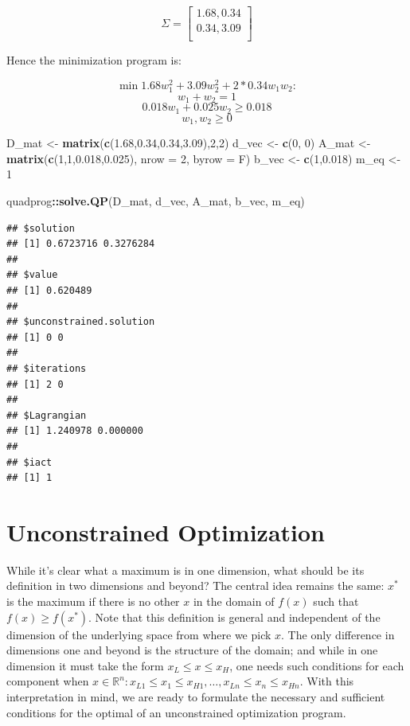 \documentclass[11pt,]{article}
\newenvironment{Shaded}{\begin{snugshade}}{\end{snugshade}}
\newcommand{\KeywordTok}[1]{\textcolor[rgb]{0.13,0.29,0.53}{\textbf{#1}}}
\newcommand{\DataTypeTok}[1]{\textcolor[rgb]{0.13,0.29,0.53}{#1}}
\newcommand{\DecValTok}[1]{\textcolor[rgb]{0.00,0.00,0.81}{#1}}
\newcommand{\FloatTok}[1]{\textcolor[rgb]{0.00,0.00,0.81}{#1}}
\newcommand{\StringTok}[1]{\textcolor[rgb]{0.31,0.60,0.02}{#1}}
\newcommand{\OperatorTok}[1]{\textcolor[rgb]{0.81,0.36,0.00}{\textbf{#1}}}
\newcommand{\NormalTok}[1]{#1}
\begin{document}
\[\Sigma = 
\begin{bmatrix}
1.68, 0.34\\
0.34, 3.09\\
\end{bmatrix}
\]

Hence the minimization program is:

\[\min{} 1.68w_1^2+3.09w_2^2+2*0.34w_1w_2:\] \[w_1+w_2=1\]
\[0.018w_1 + 0.025w_2 \geq 0.018\] \[w_1, w_2\geq 0\]

\begin{Shaded}
\begin{Highlighting}[]
\NormalTok{D_mat <-}\StringTok{ }\KeywordTok{matrix}\NormalTok{(}\KeywordTok{c}\NormalTok{(}\FloatTok{1.68}\NormalTok{,}\FloatTok{0.34}\NormalTok{,}\FloatTok{0.34}\NormalTok{,}\FloatTok{3.09}\NormalTok{),}\DecValTok{2}\NormalTok{,}\DecValTok{2}\NormalTok{)}
\NormalTok{d_vec <-}\StringTok{ }\KeywordTok{c}\NormalTok{(}\DecValTok{0}\NormalTok{, }\DecValTok{0}\NormalTok{)}
\NormalTok{A_mat <-}\StringTok{ }\KeywordTok{matrix}\NormalTok{(}\KeywordTok{c}\NormalTok{(}\DecValTok{1}\NormalTok{,}\DecValTok{1}\NormalTok{,}\FloatTok{0.018}\NormalTok{,}\FloatTok{0.025}\NormalTok{), }\DataTypeTok{nrow =} \DecValTok{2}\NormalTok{, }\DataTypeTok{byrow =}\NormalTok{ F)}
\NormalTok{b_vec <-}\StringTok{ }\KeywordTok{c}\NormalTok{(}\DecValTok{1}\NormalTok{,}\FloatTok{0.018}\NormalTok{)}
\NormalTok{m_eq <-}\StringTok{ }\DecValTok{1}

\NormalTok{quadprog}\OperatorTok{::}\KeywordTok{solve.QP}\NormalTok{(D_mat, d_vec, A_mat, b_vec, m_eq)}
\end{Highlighting}
\end{Shaded}

\begin{verbatim}
## $solution
## [1] 0.6723716 0.3276284
## 
## $value
## [1] 0.620489
## 
## $unconstrained.solution
## [1] 0 0
## 
## $iterations
## [1] 2 0
## 
## $Lagrangian
## [1] 1.240978 0.000000
## 
## $iact
## [1] 1
\end{verbatim}

\section{Unconstrained Optimization}\label{unconstrained-optimization}

While it's clear what a maximum is in one dimension, what should be its
definition in two dimensions and beyond? The central idea remains the
same: \(x^*\) is the maximum if there is no other \(x\) in the domain of
\(f(x)\) such that \(f(x)\geq f(x^*)\). Note that this definition is
general and independent of the dimension of the underlying space from
where we pick \(x\). The only difference in dimensions one and beyond is
the structure of the domain; and while in one dimension it must take the
form \(x_L\leq x\leq x_H\), one needs such conditions for each component
when
\(x\in \mathbb{R}^n: x_{L1}\leq x_1\leq x_{H1}, \hdots, x_{Ln}\leq x_n\leq x_{Hn}\).
With this interpretation in mind, we are ready to formulate the
necessary and sufficient conditions for the optimal of an unconstrained
optimization program.
\end{document}
